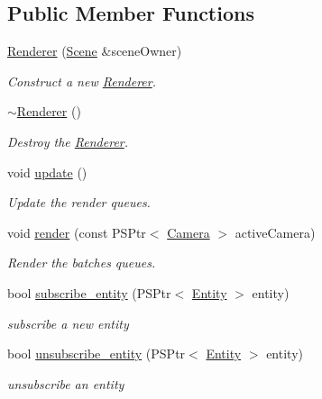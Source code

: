 \subsection*{Public Member Functions}
\begin{DoxyCompactItemize}
\item 
\mbox{\hyperlink{classprz_1_1_renderer_ac65609621c2c993fd923a74d5c9f6042}{Renderer}} (\mbox{\hyperlink{classprz_1_1_scene}{Scene}} \&scene\+Owner)
\begin{DoxyCompactList}\small\item\em Construct a new \mbox{\hyperlink{classprz_1_1_renderer}{Renderer}}. \end{DoxyCompactList}\item 
\mbox{\hyperlink{classprz_1_1_renderer_aa4a2a69d65e8c6f30c4fcf693c006f08}{$\sim$\+Renderer}} ()
\begin{DoxyCompactList}\small\item\em Destroy the \mbox{\hyperlink{classprz_1_1_renderer}{Renderer}}. \end{DoxyCompactList}\item 
void \mbox{\hyperlink{classprz_1_1_renderer_a6afd9f0501d72f9a128625ad2d28a59d}{update}} ()
\begin{DoxyCompactList}\small\item\em Update the render queues. \end{DoxyCompactList}\item 
void \mbox{\hyperlink{classprz_1_1_renderer_a1b1894524e453b510ef23fec58aa12a2}{render}} (const P\+S\+Ptr$<$ \mbox{\hyperlink{classprz_1_1_camera}{Camera}} $>$ active\+Camera)
\begin{DoxyCompactList}\small\item\em Render the batches queues. \end{DoxyCompactList}\item 
bool \mbox{\hyperlink{classprz_1_1_renderer_a479da300bc28d8d22ac26cbed51423f4}{subscribe\+\_\+entity}} (P\+S\+Ptr$<$ \mbox{\hyperlink{classprz_1_1_entity}{Entity}} $>$ entity)
\begin{DoxyCompactList}\small\item\em subscribe a new entity \end{DoxyCompactList}\item 
bool \mbox{\hyperlink{classprz_1_1_renderer_acc8bf8513b1b3c9e649ff34a93abd18f}{unsubscribe\+\_\+entity}} (P\+S\+Ptr$<$ \mbox{\hyperlink{classprz_1_1_entity}{Entity}} $>$ entity)
\begin{DoxyCompactList}\small\item\em unsubscribe an entity \end{DoxyCompactList}\item 

\end{DoxyCompactItemize}
